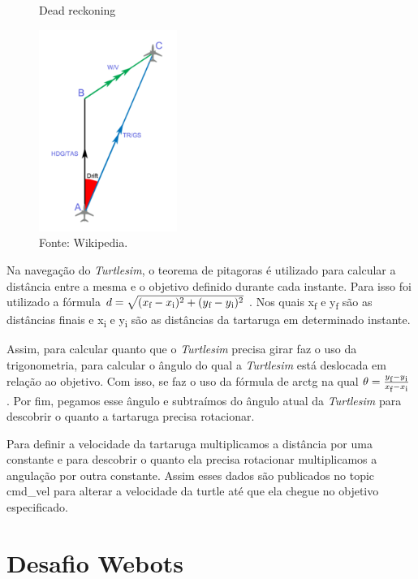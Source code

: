 \begin{figure}[h!]
    \centering
    \caption{Dead reckoning}
    \includegraphics[width=0.4\textwidth]{Figures/dead_reck.png}
    \caption*{Fonte: Wikipedia.}
    \label{fig:Dead reckoning}
\end{figure}

Na navegação do \textit{Turtlesim}, o teorema de pitagoras é utilizado para calcular
a distância entre a mesma e o objetivo definido durante cada instante. Para isso foi utilizado a fórmula 
    $d = \sqrt{(x\textsubscript{f} - x\textsubscript{i})^2 + (y\textsubscript{f} - y\textsubscript{i})^2}$
. Nos quais x\textsubscript{f} e y\textsubscript{f} são as distâncias finais e x\textsubscript{i} e y\textsubscript{i} são as distâncias da tartaruga em determinado instante.

Assim, para calcular quanto que o \textit{Turtlesim} precisa girar faz o uso da trigonometria, para calcular o ângulo do qual a \textit{Turtlesim} está deslocada  em relação ao objetivo. Com isso, se faz o uso da fórmula de arctg na qual 
$\theta = \frac{y\textsubscript{f} - y\textsubscript{i}}{x\textsubscript{f} - x\textsubscript{i}} $
. Por fim, pegamos esse ângulo e subtraímos do ângulo atual da \textit{Turtlesim} para descobrir o quanto a tartaruga precisa rotacionar.

Para definir a velocidade da tartaruga multiplicamos a distância por uma constante e para descobrir o quanto ela precisa rotacionar multiplicamos a 
angulação por outra constante. Assim esses dados são publicados no topic
cmd\_vel para alterar a velocidade da turtle até que ela chegue no objetivo
especificado.

\section{Desafio Webots}


